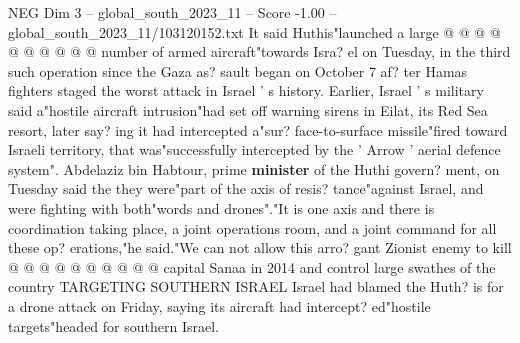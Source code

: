 \begin{textsample}{NEG Dim 3 – global\_south\_2023\_11 – Score -1.00 – global\_south\_2023\_11/103120152.txt}
It said Huthis"launched a large @ @ @ @ @ @ @ @ @ @ number of armed aircraft"towards Isra? el on Tuesday, in the third such operation since the Gaza as? sault began on October 7 af? ter Hamas fighters staged the worst attack in Israel ' s history.
Earlier, Israel ' s military said a"hostile aircraft intrusion"had set off warning sirens in Eilat, its Red Sea resort, later say? ing it had intercepted a"sur? face-to-surface missile"fired toward Israeli territory, that was"successfully intercepted by the ' Arrow ' aerial defence system".
Abdelaziz bin Habtour, prime \textbf{minister} of the Huthi govern? ment, on Tuesday said the they were"part of the axis of resis? tance"against Israel, and were fighting with both"words and drones"."It is one axis and there is coordination taking place, a joint operations room, and a joint command for all these op? erations,"he said."We can not allow this arro? gant Zionist enemy to kill @ @ @ @ @ @ @ @ @ @ capital Sanaa in 2014 and control large swathes of the country TARGETING SOUTHERN ISRAEL Israel had blamed the Huth? is for a drone attack on Friday, saying its aircraft had intercept? ed"hostile targets"headed for southern Israel.

\end{textsample}

